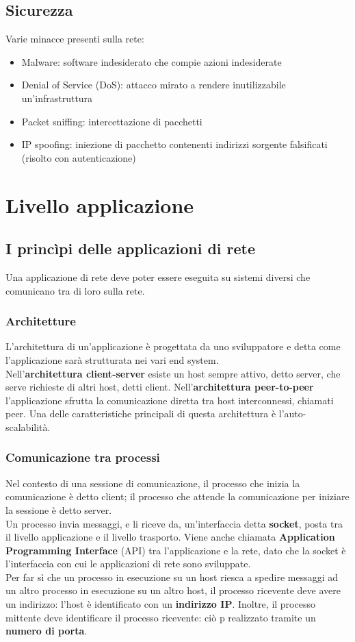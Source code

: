 \documentclass[11pt]{article}
\begin{document}
\subsection{Sicurezza}
Varie minacce presenti sulla rete:
\begin{itemize}
    \item Malware: software indesiderato che compie azioni indesiderate
    \item Denial of Service (DoS): attacco mirato a rendere inutilizzabile un'infrastruttura
    \item Packet sniffing: intercettazione di pacchetti 
    \item IP spoofing: iniezione di pacchetto contenenti indirizzi sorgente falsificati (risolto con autenticazione)
\end{itemize}
\section{Livello applicazione}
\subsection{I princìpi delle applicazioni di rete}
Una applicazione di rete deve poter essere eseguita su sistemi diversi che comunicano tra di loro sulla rete.
\subsubsection{Architetture}
L'architettura di un'applicazione è progettata da uno sviluppatore e detta come l'applicazione sarà strutturata nei vari
end system.\\
Nell'\textbf{architettura client-server} esiste un host sempre attivo, detto server, che serve richieste di altri host,
detti client. Nell'\textbf{architettura peer-to-peer} l'applicazione sfrutta la comunicazione diretta tra host 
interconnessi, chiamati peer. Una delle caratteristiche principali di questa architettura è l'auto-scalabilità.
\subsubsection{Comunicazione tra processi}
Nel contesto di una sessione di comunicazione, il processo che inizia la comunicazione è detto client; il processo che
attende la comunicazione per iniziare la sessione è detto server.\\
Un processo invia messaggi, e li riceve da, un'interfaccia detta \textbf{socket}, posta tra il livello applicazione e il
livello trasporto. Viene anche chiamata \textbf{Application Programming Interface} (API) tra l'applicazione e la rete,
dato che la socket è l'interfaccia con cui le applicazioni di rete sono sviluppate.\\
Per far sì che un processo in esecuzione su un host riesca a spedire messaggi ad un altro processo in esecuzione su un
altro host, il processo ricevente deve avere un indirizzo: l'host è identificato con un \textbf{indirizzo IP}. Inoltre,
il processo mittente deve identificare il processo ricevente: ciò p realizzato tramite un \textbf{numero di porta}.
\end{document}
